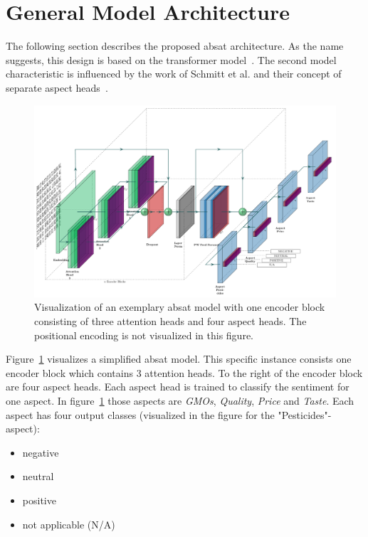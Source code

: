 \section{General Model Architecture}

The following section describes the proposed \acrfull{absat} architecture. As the name suggests, this design is based on the transformer model~\cite{Vaswani2017}. The second model characteristic is influenced by the work of Schmitt et al. and their concept of separate aspect heads~\cite{Schmitt2018}.
\bigskip

\begin{figure}[htp]
    \centering
    \includegraphics[width=\textwidth]{figures/04_method/04_t-absa}
    \caption{Visualization of an exemplary \acrfull{absat} model with one encoder block consisting of three attention heads and four aspect heads. The positional encoding is not visualized in this figure.}
    \label{fig:04_t-absa}
\end{figure}

Figure~\ref{fig:04_t-absa} visualizes a simplified \gls{absat} model. This specific instance consists one encoder block which contains 3 attention heads. To the right of the encoder block are four aspect heads. Each aspect head is trained to classify the sentiment for one aspect. In figure~\ref{fig:04_t-absa} those aspects are \textit{GMOs}, \textit{Quality}, \textit{Price} and \textit{Taste}. Each aspect has four output classes {(visualized in the figure for the "Pesticides"-aspect)}:

\begin{itemize}
    \item negative
    \item neutral
    \item positive
    \item not applicable {(N/A)}
\end{itemize}

